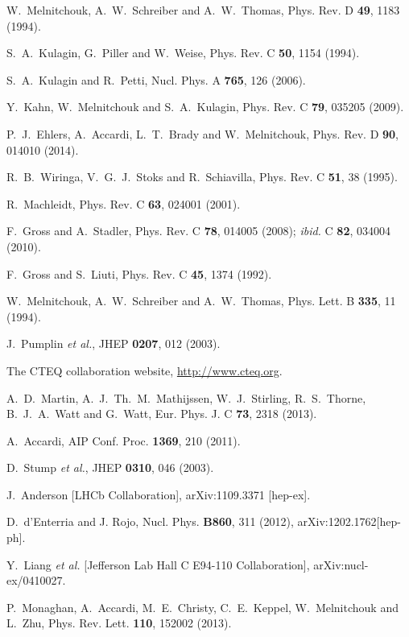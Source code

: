 \documentclass[aps,prd,amsmath,preprint]{revtex4}
\begin{document}
\begin{thebibliography}{99}
W.~Melnitchouk, A.~W.~Schreiber and A.~W.~Thomas,
Phys. Rev. D {\bf 49}, 1183 (1994).

S.~A.~Kulagin, G.~Piller and W.~Weise,
Phys. Rev. C {\bf 50}, 1154 (1994).

S.~A.~Kulagin and R.~Petti,
Nucl. Phys. A {\bf 765}, 126 (2006).

Y.~Kahn, W.~Melnitchouk and S.~A.~Kulagin,
Phys. Rev. C {\bf 79}, 035205 (2009).

P.~J.~Ehlers, A.~Accardi, L.~T.~Brady and W.~Melnitchouk,
Phys. Rev. D {\bf 90}, 014010 (2014).

R.~B.~Wiringa, V.~G.~J.~Stoks and R.~Schiavilla,
Phys. Rev. C {\bf 51}, 38 (1995).

R.~Machleidt,
Phys. Rev. C {\bf 63}, 024001 (2001).

F.~Gross and A.~Stadler,
Phys. Rev. C {\bf 78}, 014005 (2008);
{\it ibid.} C {\bf 82}, 034004 (2010).

F.~Gross and S.~Liuti,
Phys. Rev. C {\bf 45}, 1374 (1992).

W.~Melnitchouk, A.~W.~Schreiber and A.~W.~Thomas,
Phys. Lett. B {\bf 335}, 11 (1994).

J.~Pumplin {\it et al.},
JHEP {\bf 0207}, 012 (2003).
 

The CTEQ collaboration website,
\url{http://www.cteq.org}.

A.~D.~Martin, A.~J.~Th.~M.~Mathijssen, W.~J.~Stirling, R.~S.~Thorne, 
B.~J.~A.~Watt and G.~Watt,
Eur. Phys. J. C {\bf 73}, 2318 (2013).

A.~Accardi,
AIP Conf. Proc. {\bf 1369}, 210 (2011).

D.~Stump {\it et al.},
JHEP {\bf 0310}, 046 (2003).

J.~Anderson [LHCb Collaboration],
arXiv:1109.3371 [hep-ex].

D.~d'Enterria and J. Rojo, Nucl. Phys. {\bf B860}, 311 (2012), 
arXiv:1202.1762[hep-ph].

Y.~Liang {\it et al.} [Jefferson Lab Hall C E94-110 Collaboration],
arXiv:nucl-ex/0410027.

P.~Monaghan, A.~Accardi, M.~E.~Christy, C.~E.~Keppel, W.~Melnitchouk
and L.~Zhu,
Phys. Rev. Lett. {\bf 110}, 152002 (2013).


\end{thebibliography}
\end{document}
